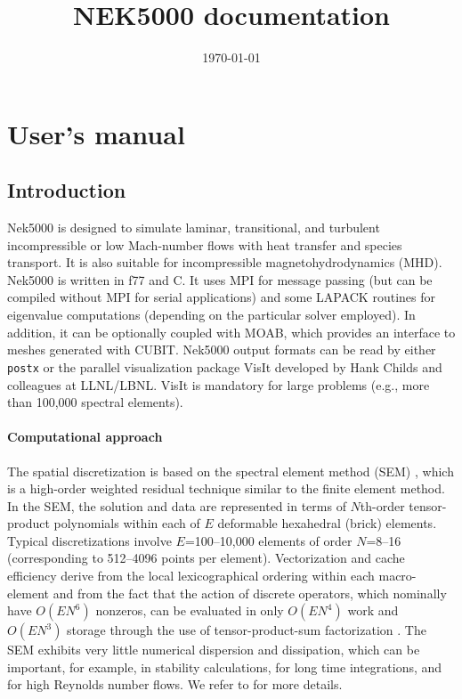 \documentclass[11pt]{report}              %
\title{\bf NEK5000 documentation}    %
\date{\today}                           %
\begin{document}
\maketitle                              %
\tableofcontents                        %

\part{User's manual} 

\chapter{Introduction}

Nek5000 is designed to simulate laminar, transitional, and turbulent
incompressible or low Mach-number flows with heat transfer and species
transport. It is also suitable for incompressible magnetohydrodynamics
(MHD). Nek5000 is written in f77 and C. It uses MPI for message passing
(but can be compiled without MPI for serial applications)
and some LAPACK routines for eigenvalue computations (depending on
the particular solver employed).  In addition, it can be optionally
coupled with MOAB, which provides an interface to meshes generated with 
CUBIT. Nek5000 output formats can be read by either {\tt postx} or the parallel visualization 
package VisIt developed by Hank Childs and colleagues at LLNL/LBNL.
VisIt is mandatory for large problems (e.g., more than 100,000 
spectral elements).
\subsection*{Computational approach}
The spatial discretization is based on 
the spectral element method (SEM) \cite{pat84}, which is a high-order 
weighted residual technique similar to the finite element method.   
In the SEM, the solution and data are represented in terms of 
$N$th-order tensor-product polynomials within each of $E$ deformable 
hexahedral (brick) elements. Typical discretizations involve $E$=100--10,000 elements of order 
$N$=8--16 (corresponding to 512--4096 points per element).
Vectorization and cache efficiency derive from the local lexicographical
ordering within each macro-element and from the fact that the action of
discrete operators, which nominally have $O(EN^6)$ nonzeros, can be evaluated
in only $O(EN^4)$ work and $O(EN^3)$ storage through the use of 
tensor-product-sum factorization \cite{sao80}.   The SEM exhibits 
very little numerical dispersion and dissipation, which can be important, 
for example, in stability calculations, for long time integrations, 
and for high Reynolds number flows. We refer to \cite{dfm02} for more
details.

\end{document}
